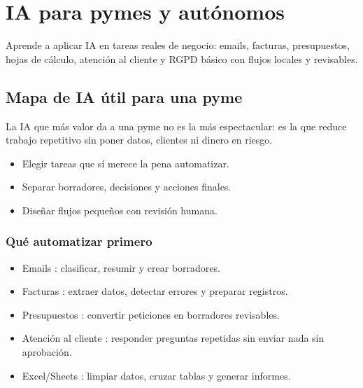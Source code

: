 \documentclass[11pt,a4paper]{book}
\begin{document}
\part{IA para pymes y autónomos}
Aprende a aplicar IA en tareas reales de negocio: emails, facturas, presupuestos, hojas de cálculo, atención al cliente y RGPD básico con flujos locales y revisables.

\chapter{Mapa de IA útil para una pyme}
La IA que más valor da a una pyme no es la más espectacular: es la que reduce trabajo repetitivo sin poner datos, clientes ni dinero en riesgo.

\begin{itemize}\item Elegir tareas que sí merece la pena automatizar.\end{itemize}
\begin{itemize}\item Separar borradores, decisiones y acciones finales.\end{itemize}
\begin{itemize}\item Diseñar flujos pequeños con revisión humana.\end{itemize}
\section{Qué automatizar primero}
\begin{itemize}\item Emails : clasificar, resumir y crear borradores.\end{itemize}
\begin{itemize}\item Facturas : extraer datos, detectar errores y preparar registros.\end{itemize}
\begin{itemize}\item Presupuestos : convertir peticiones en borradores revisables.\end{itemize}
\begin{itemize}\item Atención al cliente : responder preguntas repetidas sin enviar nada sin aprobación.\end{itemize}
\begin{itemize}\item Excel/Sheets : limpiar datos, cruzar tablas y generar informes.\end{itemize}
\end{document}
